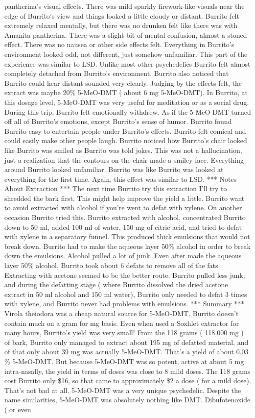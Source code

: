 \documentclass[12pt]{book}
\begin{document}
pantherina's visual effects. There was mild sparkly firework-like visuals near the edge of Burrito's view and things looked a little cloudy or distant. Burrito felt extremely relaxed mentally, but there was no drunken felt like there was with Amanita pantherina. There was a slight bit of mental confusion, almost a stoned effect. There was no nausea or other side effects felt. Everything in Burrito's environment looked odd, not different, just somehow unfamiliar. This part of the experience was similar to LSD. Unlike most other psychedelics Burrito felt almost completely detached from Burrito's environment. Burrito also noticed that Burrito could hear distant sounded very clearly. Judging by the effects felt, the extract was maybe 20\% 5-MeO-DMT ( about 6 mg 5-MeO-DMT). In Burrito, at this dosage level, 5-MeO-DMT was very useful for meditation or as a social drug. During this trip, Burrito felt emotionally withdrew. As if the 5-MeO-DMT turned off all of Burrito's emotions, except Burrito's sense of humor. Burrito found Burrito easy to entertain people under Burrito's effects. Burrito felt comical and could easily make other people laugh. Burrito noticed how Burrito's chair looked like Burrito was smiled as Burrito was told jokes. This was not a hallucination, just a realization that the contours on the chair made a smiley face. Everything around Burrito looked unfamiliar. Burrito was like Burrito was looked at everything for the first time. Again, this effect was similar to LSD. *** Notes About Extraction *** The next time Burrito try this extraction I'll try to shredded the bark first. This might help improve the yield a little. Burrito want to avoid extracted with alcohol if you're went to defat with xylene. On another occasion Burrito tried this. Burrito extracted with alcohol, concentrated Burrito down to 50 ml, added 100 ml of water, 150 mg of citric acid, and tried to defat with xylene in a separatory funnel. This produced thick emulsions that would not break down. Burrito had to make the aqueous layer 50\% alcohol in order to break down the emulsions. Alcohol pulled a lot of junk. Even after made the aqueous layer 50\% alcohol, Burrito took about 6 defats to remove all of the fats. Extracting with acetone seemed to be the better route. Burrito pulled less junk; and during the defatting stage ( where Burrito dissolved the dried acetone extract in 50 ml alcohol and 150 ml water), Burrito only needed to defat 3 times with xylene, and Burrito never had problems with emulsions. *** Summary *** Virola theiodora was a cheap natural source for 5-MeO-DMT. Burrito doesn't contain much on a gram for mg basis. Even when used a Soxhlet extractor for many hours, Burrito's yield was very small! From the 118 grams ( 118,000 mg ) of bark, Burrito only managed to extract about 195 mg of defatted material, and of that only about 39 mg was actually 5-MeO-DMT. That's a yield of about 0.03 \% 5-MeO-DMT. But because 5-MeO-DMT was so potent, active at about 5 mg intra-nasally, the yield in terms of doses was close to 8 mild doses. The 118 grams cost Burrito only \$16, so that came to approximately \$2 a dose ( for a mild dose). That's not bad at all. 5-MeO-DMT was a very unique psychedelic. Despite the name similarities, 5-MeO-DMT was absolutely nothing like DMT. Dibufotenoxide ( or even 
\end{document}
